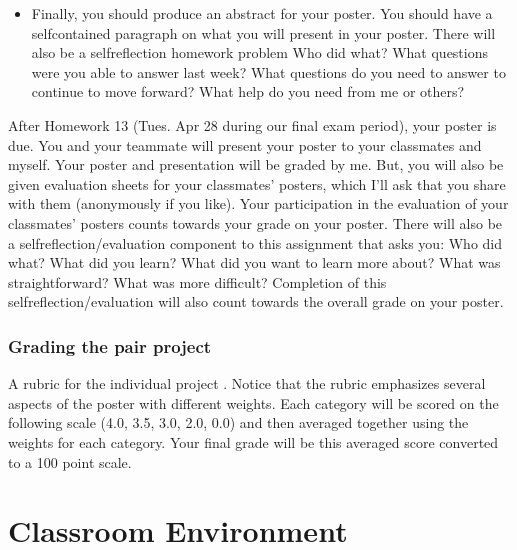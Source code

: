 \documentclass[letterpaper,10pt,english]{jupyterBook}
\begin{document}
\begin{itemize}
\item {} 
\sphinxAtStartPar
{} \sphinxhyphen{} Finally, you should produce an abstract for your poster. You should have a self\sphinxhyphen{}contained paragraph on what you will present in your poster. There will also be a self\sphinxhyphen{}reflection homework problem \sphinxhyphen{} Who did what? What questions were you able to answer last week? What questions do you need to answer to continue to move forward? What help do you need from me or others?

\end{itemize}

\sphinxAtStartPar
After Homework 13 (Tues. Apr 28 \sphinxhyphen{} during our final exam period), your poster is due. You and your teammate will present your poster to your classmates and myself. Your poster and presentation will be graded by me. But, you will also be given evaluation sheets for your classmates’ posters, which I’ll ask that you share with them (anonymously if you like). Your participation in the evaluation of your classmates’ posters counts towards your grade on your poster. There will also be a self\sphinxhyphen{}reflection/evaluation component to this assignment that asks you: Who did what? What did you learn? What did you want to learn more about? What was straight\sphinxhyphen{}forward? What was more difficult? Completion of this self\sphinxhyphen{}reflection/evaluation will also count towards the overall grade on your poster.


\subsubsection{Grading the pair project}
\label{\detokenize{content/0_course/assessments:grading-the-pair-project}}
\sphinxAtStartPar
A rubric for the individual project . Notice that the rubric emphasizes several aspects of the poster with different weights. Each category will be scored on the following scale (4.0, 3.5, 3.0, 2.0, 0.0) and then averaged together using the weights for each category. Your final grade will be this averaged score converted to a 100 point scale.

\sphinxstepscope


\section{Classroom Environment}
\label{\detokenize{content/0_course/environment:classroom-environment}}\label{\detokenize{content/0_course/environment::doc}}
\end{document}
